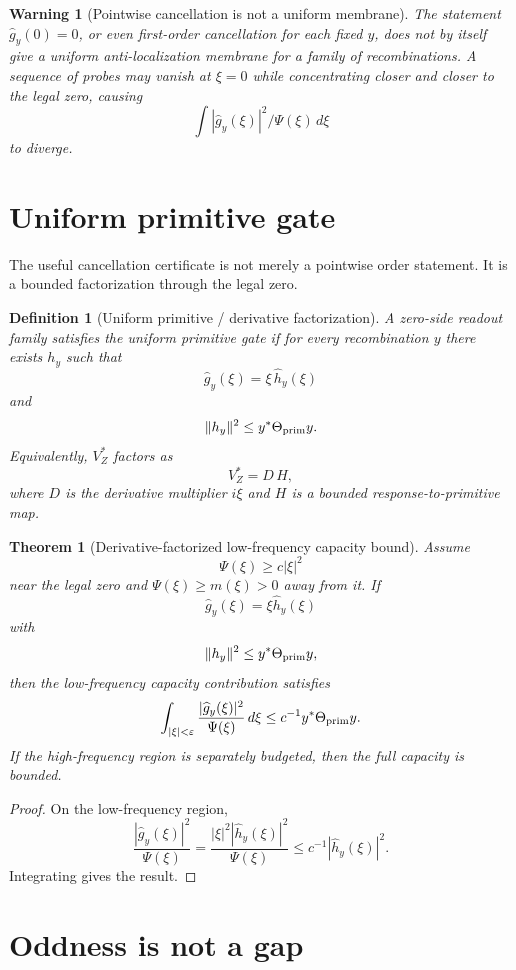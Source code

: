 \documentclass[11pt]{article}
\newtheorem{theorem}{Theorem}
\newtheorem{definition}{Definition}
\newtheorem{warning}{Warning}
\begin{document}
\begin{warning}[Pointwise cancellation is not a uniform membrane]
The statement \(\widehat g_y(0)=0\), or even first-order cancellation for each fixed \(y\), does not by itself give a uniform anti-localization membrane for a family of recombinations.  A sequence of probes may vanish at \(\xi=0\) while concentrating closer and closer to the legal zero, causing
\[
\int |\widehat g_y(\xi)|^2/\Psi(\xi)\,d\xi
\]
to diverge.
\end{warning}

\section{Uniform primitive gate}

The useful cancellation certificate is not merely a pointwise order statement.  It is a bounded factorization through the legal zero.

\begin{definition}[Uniform primitive / derivative factorization]
A zero-side readout family satisfies the uniform primitive gate if for every recombination \(y\) there exists \(h_y\) such that
\[
\widehat g_y(\xi)=\xi\,\widehat h_y(\xi)
\]
and
\[
\|h_y\|^2\le y^*\Theta_{\rm prim}y .
\]
Equivalently, \(V_Z^*\) factors as
\[
V_Z^*=D\,H,
\]
where \(D\) is the derivative multiplier \(i\xi\) and \(H\) is a bounded response-to-primitive map.
\end{definition}

\begin{theorem}[Derivative-factorized low-frequency capacity bound]
Assume
\[
\Psi(\xi)\ge c|\xi|^2
\]
near the legal zero and \(\Psi(\xi)\ge m(\xi)>0\) away from it.  If
\[
\widehat g_y(\xi)=\xi\widehat h_y(\xi)
\]
with
\[
\|h_y\|^2\le y^*\Theta_{\rm prim}y,
\]
then the low-frequency capacity contribution satisfies
\[
\int_{|\xi|<\varepsilon}
\frac{|\widehat g_y(\xi)|^2}{\Psi(\xi)}\,d\xi
\le
c^{-1}y^*\Theta_{\rm prim}y .
\]
If the high-frequency region is separately budgeted, then the full capacity is bounded.
\end{theorem}

\begin{proof}
On the low-frequency region,
\[
\frac{|\widehat g_y(\xi)|^2}{\Psi(\xi)}
=
\frac{|\xi|^2|\widehat h_y(\xi)|^2}{\Psi(\xi)}
\le
c^{-1}|\widehat h_y(\xi)|^2.
\]
Integrating gives the result.
\end{proof}

\section{Oddness is not a gap}
\end{document}
